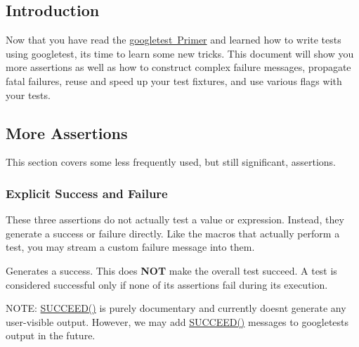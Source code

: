 \subsection*{Introduction}

Now that you have read the \mbox{\hyperlink{_obj__test_2lib_2googletest-release-1_88_81_2googletest_2docs_2primer_8md}{googletest Primer}} and learned how to write tests using googletest, it\textquotesingle{}s time to learn some new tricks. This document will show you more assertions as well as how to construct complex failure messages, propagate fatal failures, reuse and speed up your test fixtures, and use various flags with your tests.

\subsection*{More Assertions}

This section covers some less frequently used, but still significant, assertions.

\subsubsection*{Explicit Success and Failure}

These three assertions do not actually test a value or expression. Instead, they generate a success or failure directly. Like the macros that actually perform a test, you may stream a custom failure message into them.


\begin{DoxyCode}{0}
\end{DoxyCode}


Generates a success. This does {\bfseries{N\+OT}} make the overall test succeed. A test is considered successful only if none of its assertions fail during its execution.

N\+O\+TE\+: {\ttfamily \mbox{\hyperlink{googletest-master_2googletest_2include_2gtest_2gtest_8h_a75adcdf89f69b0b615e395daafc315af}{S\+U\+C\+C\+E\+E\+D()}}} is purely documentary and currently doesn\textquotesingle{}t generate any user-\/visible output. However, we may add {\ttfamily \mbox{\hyperlink{googletest-master_2googletest_2include_2gtest_2gtest_8h_a75adcdf89f69b0b615e395daafc315af}{S\+U\+C\+C\+E\+E\+D()}}} messages to googletest\textquotesingle{}s output in the future.


\begin{DoxyCode}{0}
\end{DoxyCode}


